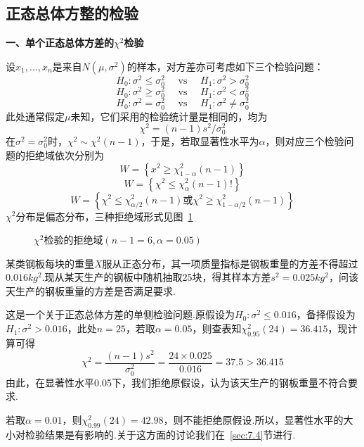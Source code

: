 \subsection{正态总体方整的检验\label{7.2.3}}

\textbf{一、单个正态总体方差的$\chi^{2}$检验}

设$x_{1},\dotsc,x_{n}$是来自$N(\mu ,\sigma^{2})$的样本，对方差亦可考虑如下三个检验问题：
\begin{equation}\label{eq7.2.22}
H _ { 0 } : \sigma ^ { 2 } \leq \sigma _ { 0 } ^ { 2 } \quad \text { vs } \quad H _ { 1 } : \sigma ^ { 2 } > \sigma _ { 0 } ^ { 2 }
\end{equation}
\begin{equation}\label{eq7.2.23}
H _ { 0 } : \sigma ^ { 2 } \geq \sigma _ { 0 } ^ { 2 } \quad \text { vs } \quad H _ { 1 } : \sigma ^ { 2 } < \sigma _ { 0 } ^ { 2 }
\end{equation}
\begin{equation}\label{eq7.2.24}
H _ { 0 } : \sigma ^ { 2 } = \sigma _ { 0 } ^ { 2 } \quad \text { vs } \quad H _ { 1 } : \sigma ^ { 2 } \ne  \sigma _ { 0 } ^ { 2 }
\end{equation}
此处通常假定$\mu$未知，它们采用的检验统计量是相同的，均为
\begin{equation}\label{eq7.2.25}
\chi ^ { 2 } = ( n - 1 ) s ^ { 2 } / \sigma _ { 0 } ^ { 2 }
\end{equation}
在$\sigma ^ { 2 } = \sigma _ { 0 } ^ { 2 }$时，$\chi ^ { 2 } \sim \chi ^ { 2 } ( n - 1 )$，于是，若取显著性水平为$\alpha$，则对应三个检验问题的拒绝域依次分别为
\[W = \left\{ x ^ { 2 } \geq \chi _ { 1 -\alpha } ^ { 2 } ( n - 1 ) \right\}\]
\[
W=\left\{\chi^2\le\chi_{\alpha}^{2}\left(n-1\right)!\right\}
\]
\[
W=\left\{\chi^2\le\chi_{\alpha/2}^{2}\left(n-1\right)\textrm{或}\chi^2\geq\chi_{1-\alpha/2}^{2}\left(n-1\right)\right\}
\]
$\chi^{2}$分布是偏态分布，三种拒绝域形式见图~\ref{fig7.2.3}
\begin{figure}[htbp]
	\centering
	\caption{$\chi^{2}$检验的拒绝域$(n-1=6,\alpha=0.05)$}\label{fig7.2.3}
\end{figure}
\begin{example}\label{exam7.2.4}
	某类钢板每块的重量$X$服从正态分布，其一项质量指标是钢板重量的方差不得超过$0.016kg^{2}$.现从某天生产的钢板中随机抽取25块，得其样本方差$s^{2}=0.025kg^{2}$，问该天生产的钢板重量的方差是否满足要求.
\end{example}
\begin{solution}
	这是一个关于正态总体方差的单侧检验问题.原假设为$H _ { 0 } : \sigma ^ { 2 } \leq 0.016$，备择假设为$H _ { 1 } : \sigma ^ { 2 } > 0.016$，此处$n=25$，若取$\alpha=0.05$，则查表知$\chi _ { 0.95 } ^ { 2 } ( 24 ) = 36.415$，现计算可得
	\[\chi ^ { 2 } = \frac { ( n - 1 ) s ^ { 2 } } { \sigma _ { 0 } ^ { 2 } } = \frac { 24 \times 0.025 } { 0.016 } = 37.5 > 36.415\]
	由此，在显著性水平0.05下，我们拒绝原假设，认为该天生产的钢板重量不符合要求.
	
	若取$\alpha=0.01$，则$\chi _ { 0.99 } ^ { 2 } ( 24 ) = 42.98$，则不能拒绝原假设.所以，显著性水平的大小对检验结果是有影响的.关于这方面的讨论我们在~\ref{sec:7.4}节进行.
\end{solution}

